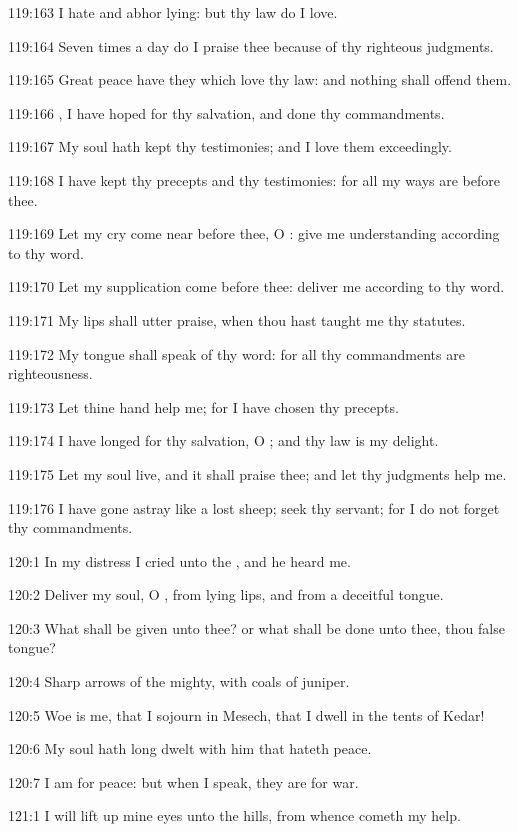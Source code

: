 119:163 I hate and abhor lying: but thy law do I love.

119:164 Seven times a day do I praise thee because of thy righteous
judgments.

119:165 Great peace have they which love thy law: and nothing shall
offend them.

119:166 \LORD, I have hoped for thy salvation, and done thy
commandments.

119:167 My soul hath kept thy testimonies; and I love them
exceedingly.

119:168 I have kept thy precepts and thy testimonies: for all my ways
are before thee.

119:169 Let my cry come near before thee, O \LORD: give me
understanding according to thy word.

119:170 Let my supplication come before thee: deliver me according to
thy word.

119:171 My lips shall utter praise, when thou hast taught me thy
statutes.

119:172 My tongue shall speak of thy word: for all thy commandments
are righteousness.

119:173 Let thine hand help me; for I have chosen thy precepts.

119:174 I have longed for thy salvation, O \LORD; and thy law is my
delight.

119:175 Let my soul live, and it shall praise thee; and let thy
judgments help me.

119:176 I have gone astray like a lost sheep; seek thy servant; for I
do not forget thy commandments.



120:1 In my distress I cried unto the \LORD, and he heard me.

120:2 Deliver my soul, O \LORD, from lying lips, and from a deceitful
tongue.

120:3 What shall be given unto thee? or what shall be done unto thee,
thou false tongue?

120:4 Sharp arrows of the mighty, with coals of juniper.

120:5 Woe is me, that I sojourn in Mesech, that I dwell in the tents
of Kedar!

120:6 My soul hath long dwelt with him that hateth peace.

120:7 I am for peace: but when I speak, they are for war.



121:1 I will lift up mine eyes unto the hills, from whence cometh my
help.


